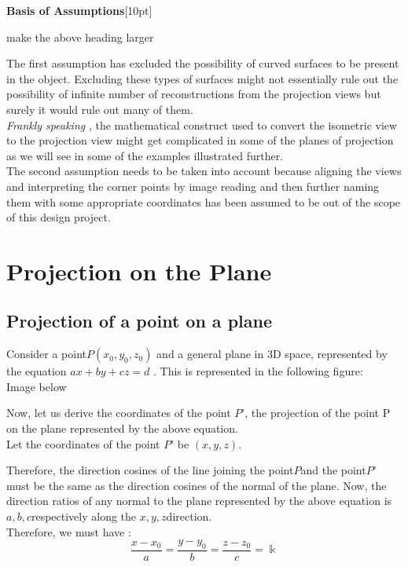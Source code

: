 \documentclass[12pt]{report}
\begin{document}
\textbf{Basis of Assumptions}[10pt]

{make the above heading larger}

The first assumption has excluded the possibility of curved surfaces to be present in the object. Excluding these types of surfaces might not essentially rule out the possibility of infinite number of reconstructions from the projection views but surely it would rule out many of them. 
\\
\vspace{0.2cm}
\hspace{1cm} \textit{ Frankly speaking } , the mathematical construct used to convert the isometric view to the projection view might get complicated in some of the planes of projection as we will see in some of the examples illustrated further.
\\
\vspace{0.2cm}
The second assumption needs to be taken into account because aligning the views and interpreting the corner points by image reading and then further naming them with some appropriate coordinates has been assumed to be out of the scope of this design project.
\\

\section{Projection on the Plane}

\subsection{Projection of a point on a plane}

Consider a point$ P (x_{0}, y_{0}, z_{0}) $ and a general plane in 3D space, represented by the equation $ax + by + cz = d$ .  This is represented in the following figure: \\
{Image below}
\vspace{4cm}

Now, let us derive the coordinates of the point $P’$, the projection of the point P on the plane  represented by the above equation.
\\
\vspace{0.3cm}
Let the coordinates of the point $ P’ $ be $(x, y, z)$.
\\
\vspace{0.3cm}

Therefore, the direction cosines of the line joining the point$ P $and the point$ P’$ must be the same as the direction cosines of the normal of the plane. Now, the direction ratios of any normal to the plane represented by the above equation is $a, b, c $respectively along the $x, y, z $direction.
\\
\vspace{0.3cm}
Therefore, we must have : 
\[ \dfrac{x - x_{0}}{a} = \dfrac{y - y_{0}}{b} = \dfrac{z - z_{0}}{c} = \Bbbk \]
\end{document}
